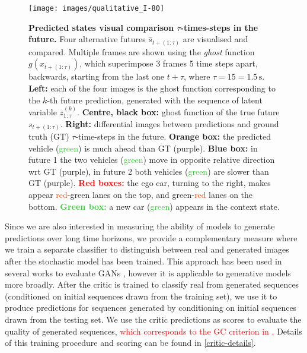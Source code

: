 \documentclass{article}
\begin{document}
\begin{figure}[t!]
  \centering
  \texttt{[image: images/qualitative\_I-80]}
  \caption{
    \textbf{Predicted states visual comparison $\tau$-times-steps in the future.}
    Four alternative futures $\hat{s}_{t+(1:\tau)}$ are visualised and compared.
    Multiple frames are shown using the \emph{ghost} function $g(x_{t+(1:\tau)})$, which superimpose 3 frames 5 time steps apart, backwards, starting from the last one $t + \tau$, where $\tau = 15 = 1.5\,\text{s}$.
    \textbf{Left:} each of the four images is the ghost function corresponding to the $k$-th future prediction, generated with the sequence of latent variable $z_{1:\tau}^{(k)}$.
    \textbf{Centre, black box:} ghost function of the true future $s_{t+(1:\tau)}$.
    \textbf{Right:} differential images between predictions  and ground truth (GT) $\tau$-time-steps in the future.
    \textcolor{Dandelion}{\textbf{Orange box:}} the predicted vehicle (\textcolor{LimeGreen}{green}) is much ahead than GT (\textcolor{Mulberry}{purple}).
    \textcolor{ProcessBlue}{\textbf{Blue box:}} in future 1 the two vehicles (\textcolor{LimeGreen}{green}) move in opposite relative direction wrt GT (\textcolor{Mulberry}{purple}), in future 2 both vehicles (\textcolor{LimeGreen}{green}) are slower than GT (\textcolor{Mulberry}{purple}).
    \textcolor{Red}{\textbf{Red boxes:}} the ego car, turning to the right, makes appear \textcolor{OrangeRed}{red}-\textcolor{PineGreen}{green} lanes on the top, and \textcolor{PineGreen}{green}-\textcolor{OrangeRed}{red} lanes on the bottom.
    \textcolor{LimeGreen}{\textbf{Green box:}} a new car (\textcolor{LimeGreen}{green}) appears in the context state.
    }
    \label{I-80_qual}
\end{figure}

Since we are also interested in measuring the ability of models to generate predictions over long time horizons, we provide a complementary measure where we train a separate classifier to distinguish between real and generated images after the stochastic model has been trained.
This approach has been used in several works to evaluate GANs \citep{Danihelka17, Rosca17, GANeval}, however it is applicable to generative models more broadly.
After the critic is trained to classify real from generated sequences (conditioned on initial sequences drawn from the training set), we use it to produce predictions for sequences generated by conditioning on initial sequences drawn from the testing set.
We use the critic predictions as scores to evaluate the quality of generated sequences, \textcolor{red}{which corresponds to the GC criterion in \citep{GANeval}.}
Details of this training procedure and scoring can be found in \cref{critic-details}.
\end{document}
